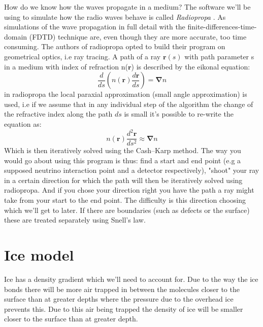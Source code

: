 How do we know how the waves propagate in a medium?  The software we'll be
using to simulate how the radio waves behave is called \textit{Radiopropa}
\cite{Winchen_2019}. As  simulations of the wave propagation in full detail
with the finite-differences-time-domain (FDTD) technique \cite{1138693} are,
even though they are more accurate, too time consuming. The authors of
radiopropa opted to build their program on geometrical optics, i.e ray
tracing. A path of a ray $\mathbf{r}(s)$ with path parameter s in a medium
with index of refraction n($\mathbf{r}$) is described by the eikonal
equation\cite{herman2019treatise}:
\begin{equation}
	\frac{d}{ds}\left(n(\mathbf{r})\frac{d\mathbf{r}}{ds}\right) = \mathbf{\nabla} n
\end{equation}
in radiopropa the local paraxial approximation (small angle approximation) is
used, i.e if we assume that in any individual step of the algorithm the change
of the refractive index along the path $ds$ is small it's possible to re-write
the equation as:
\begin{equation}
	n(\mathbf{r})\frac{d^2\mathbf{r}}{ds^2} \approx \mathbf{\nabla} n
	\label{eqn:radiopropaformula}
\end{equation}
Which is then iteratively solved using the Cash–Karp method.  The way you would
go about using this program is thus: find a start and end point (e.g a supposed
neutrino interaction point and a detector respectively), "shoot" your ray in a
certain direction for which the path will then be iteratively solved using
radiopropa. And if you chose your direction right you have the path a ray might
take from your start to the end point.  The difficulty is this direction
choosing which we'll get to later.  If there are boundaries (such as defects or
the surface) these are treated separately using Snell's law. 
\section{Ice model}
\label{section:Ice Model}
Ice has a density gradient which we'll need to account for. Due to the way the
ice bonds there will be more air trapped in between the molecules closer to the
surface than at greater depths where the pressure due to the overhead ice
prevents this.  Due to this air being trapped the density of ice will be
smaller closer to the surface than at greater depth.  

